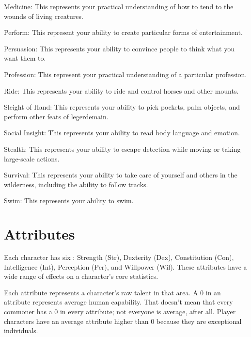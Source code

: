 \begin{raggeditemize}
            \item Medicine: This represents your practical understanding of how to tend to the wounds of living creatures.
            \item Perform: This represent your ability to create particular forms of entertainment.
            \item Persuasion: This represents your ability to convince people to think what you want them to.
            \item Profession: This represent your practical understanding of a particular profession.
            \item Ride: This represents your ability to ride and control horses and other mounts.
            \item Sleight of Hand: This represents your ability to pick pockets, palm objects, and perform other feats of legerdemain.
            \item Social Insight: This represents your ability to read body language and emotion.
            \item Stealth: This represents your ability to escape detection while moving or taking large-scale actions.
            \item Survival: This represents your ability to take care of yourself and others in the wilderness, including the ability to follow tracks.
            \item Swim: This represents your ability to swim.
        \end{raggeditemize}

\section{Attributes}\label{Attributes}

    Each character has six : Strength (Str), Dexterity (Dex), Constitution (Con), Intelligence (Int), Perception (Per), and Willpower (Wil).
    These attributes have a wide range of effects on a character's core statistics.

    Each attribute represents a character's raw talent in that area.
    A 0 in an attribute represents average human capability.
    That doesn't mean that every commoner has a 0 in every attribute; not everyone is average, after all.
    Player characters have an average attribute higher than 0 because they are exceptional individuals.

